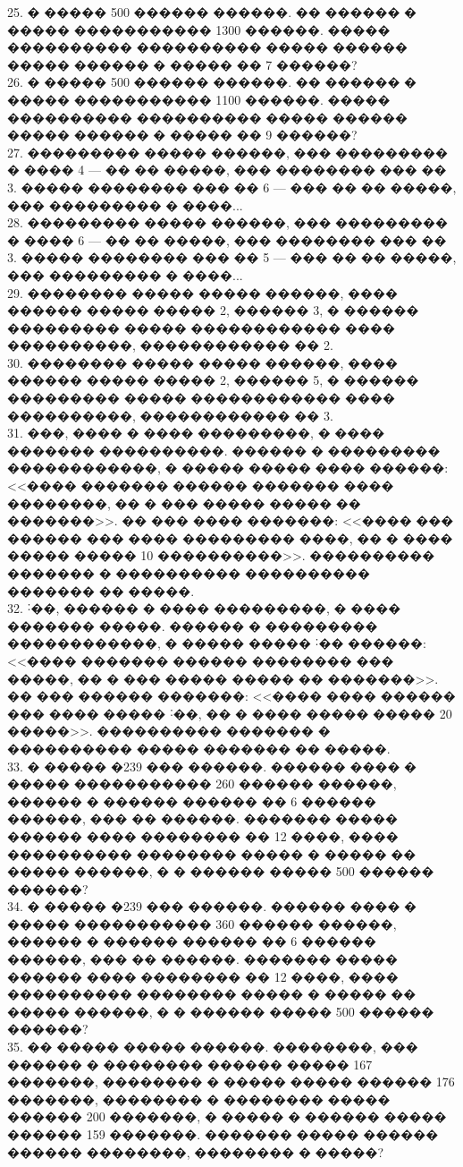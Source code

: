\documentclass[12pt]{article}
\begin{document}
25. � ����� 500 ������ ������. �� ������ � ����� ����������� 1300 ������. ����� ���������� ���������� ����� ������ ����� ������ � ����� �� 7 ������?\\
26. � ����� 500 ������ ������. �� ������ � ����� ����������� 1100 ������. ����� ���������� ���������� ����� ������ ����� ������ � ����� �� 9 ������?\\
27. ��������� ����� ������, ��� ��������� � ���� 4 --- �� �� �����, ��� �������� ��� �� 3. ����� �������� ��� �� 6 --- ��� �� �� �����, ��� ��������� � ����...\\
28. ��������� ����� ������, ��� ��������� � ���� 6 --- �� �� �����, ��� �������� ��� �� 3. ����� �������� ��� �� 5 --- ��� �� �� �����, ��� ��������� � ����...\\
29. �������� ����� ����� ������, ���� ������ ����� ����� 2, ������ 3, � ������ ��������� ����� ������������ ���� ����������, ������������ �� 2.\\
30. �������� ����� ����� ������, ���� ������ ����� ����� 2, ������ 5, � ������ ��������� ����� ������������ ���� ����������, ������������ �� 3.\\
31. ���, ���� � ���� ���������, � ���� ������� ����������. ������ � ��������� ������������, � ����� ����� ���� ������: <<���� ������� ������ ������� ���� ��������, �� � ��� ����� ����� �� �������>>. �� ��� ���� �������: <<���� ��� ������ ��� ���� ��������� ����, �� � ���� ����� ����� 10 ����������>>. ���������� ������� � ���������� ���������� ������� �� �����.\\
32. ˸��, ������ � ���� ���������, � ���� ������� �����. ������ � ��������� ������������, � ����� ����� ˸�� ������: <<���� ������� ������ �������� ��� �����, �� � ��� ����� ����� �� �������>>. �� ��� ������ �������: <<���� ���� ������ ��� ���� ����� ˸��, �� � ���� ����� ����� 20 �����>>. ���������� ������� � ���������� ����� ������� �� �����.\\
33. � ����� �239 ��� ������. ������ ���� � ����� ����������� 260 ������ ������, ������ � ������ ������ �� 6 ������ ������, ��� �� ������. ������� ����� ������ ���� �������� �� 12 ����, ���� ���������� �������� ����� � ����� �� ����� ������, � � ������ ����� 500 ������ ������?\\
34. � ����� �239 ��� ������. ������ ���� � ����� ����������� 360 ������ ������, ������ � ������ ������ �� 6 ������ ������, ��� �� ������. ������� ����� ������ ���� �������� �� 12 ����, ���� ���������� �������� ����� � ����� �� ����� ������, � � ������ ����� 500 ������ ������?\\
35. �� ����� ����� ������. ��������, ��� ������ � �������� ������ ����� 167 �������, �������� � ����� ����� ������ 176 �������, �������� � �������� ����� ������ 200 �������, � ����� � ������ ����� ������ 159 �������. ������� ����� ������ ������ ��������, �������� � �����?\\
\end{document}

